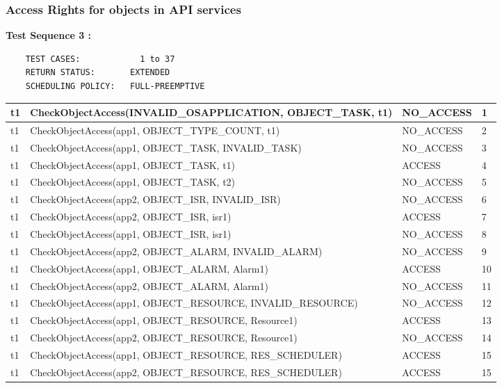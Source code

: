\documentclass[10pt]{article}
\newlength{\Li}\settowidth{\Li}{Running}
\newlength{\Lii}\setlength{\Lii}{7cm}
\newlength{\Liiii}\setlength{\Liiii}{0.9cm}
\newlength{\Liii}\setlength{\Liii}{\textwidth} \addtolength{\Liii}{-\Li} \addtolength{\Liii}{-\Lii} \addtolength{\Liii}{-\Liiii}
\begin{document}
	\subsubsection{Access Rights for objects in API services}

	\textbf{Test Sequence 3 :}
	\begin{lstlisting}
	TEST CASES:		       1 to 37
	RETURN STATUS:	  	 EXTENDED
	SCHEDULING POLICY:   FULL-PREEMPTIVE
	\end{lstlisting}
	

	\begin{supertabular}{|p{\Li}|p{\Lii}|p{\Liii}|p{\Liiii}|} \hline 
	t1		& CheckObjectAccess(INVALID\_OSAPPLICATION, OBJECT\_TASK, t1)				& NO\_ACCESS					& 1 \\ \hline
	t1		& CheckObjectAccess(app1, OBJECT\_TYPE\_COUNT, t1)						& NO\_ACCESS					& 2 \\ \hline
	t1		& CheckObjectAccess(app1, OBJECT\_TASK, INVALID\_TASK)					& NO\_ACCESS					& 3 \\ \hline
	t1		& CheckObjectAccess(app1, OBJECT\_TASK, t1)								& ACCESS						& 4 \\ \hline
	t1		& CheckObjectAccess(app1, OBJECT\_TASK, t2)								& NO\_ACCESS					& 5 \\ \hline
	
	t1		& CheckObjectAccess(app2, OBJECT\_ISR, INVALID\_ISR)						& NO\_ACCESS					& 6 \\ \hline
	t1		& CheckObjectAccess(app2, OBJECT\_ISR, isr1)								& ACCESS						& 7 \\ \hline
	t1		& CheckObjectAccess(app1, OBJECT\_ISR, isr1)								& NO\_ACCESS					& 8 \\ \hline
	
	t1		& CheckObjectAccess(app2, OBJECT\_ALARM, INVALID\_ALARM)				& NO\_ACCESS					& 9 \\ \hline
	t1		& CheckObjectAccess(app1, OBJECT\_ALARM, Alarm1)							& ACCESS						& 10 \\ \hline
	t1		& CheckObjectAccess(app2, OBJECT\_ALARM, Alarm1)							& NO\_ACCESS					& 11 \\ \hline
	
	t1		& CheckObjectAccess(app1, OBJECT\_RESOURCE, INVALID\_RESOURCE)			& NO\_ACCESS					& 12 \\ \hline
	t1		& CheckObjectAccess(app1, OBJECT\_RESOURCE, Resource1)					& ACCESS						& 13 \\ \hline
	t1		& CheckObjectAccess(app2, OBJECT\_RESOURCE, Resource1)					& NO\_ACCESS					& 14 \\ \hline
	t1		& CheckObjectAccess(app1, OBJECT\_RESOURCE, RES\_SCHEDULER)			& ACCESS						& 15 \\ \hline
	t1		& CheckObjectAccess(app2, OBJECT\_RESOURCE, RES\_SCHEDULER)			& ACCESS						& 15 \\ \hline
	

\end{supertabular}
\end{document}
